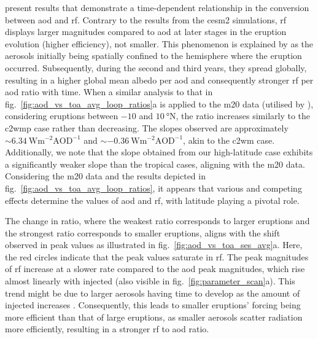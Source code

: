 \documentclass{ametsocV6.1}
\newcommand{\iso}[1][i]{{#1}njected \ce{SO2}}
\begin{document}
\citet[][their Fig.\ 1c,d]{marshall2020} present results that demonstrate a
time-dependent relationship in the conversion between \gls{aod} and \gls{rf}. Contrary
to the results from the \gls{cesm2} simulations, \gls{rf} displays larger magnitudes
compared to \gls{aod} at later stages in the eruption evolution (higher efficiency), not
smaller. This phenomenon is explained by \citet{marshall2020} as the aerosols initially
being spatially confined to the hemisphere where the eruption occurred. Subsequently,
during the second and third years, they spread globally, resulting in a higher global
mean albedo per \gls{aod} and consequently stronger \gls{rf} per \gls{aod} ratio with
time. When a similar analysis to that in fig.~\ref{fig:aod_vs_toa_avg_loop_ratios}a is
applied to the \gls{m20} data (utilised by \citet{marshall2020}), considering eruptions
between \(-10\) and \(\SI{10}{\degree\mathrm{N}}\), the ratio increases similarly to the
\gls{c2wmp} case rather than decreasing. The slopes observed are approximately
\(\sim\SI{6.34}{\watt\metre^{-2}\mathrm{AOD}^{-1}}\) and
\(\sim\SI{-0.36}{\watt\metre^{-2}\mathrm{AOD}^{-1}}\), akin to the \gls{c2wm} case.
Additionally, we note that the slope obtained from our high-latitude case exhibits a
significantly weaker slope than the tropical cases, aligning with the \gls{m20} data.
Considering the \gls{m20} data and the results depicted in
fig.~\ref{fig:aod_vs_toa_avg_loop_ratios}, it appears that various and competing effects
determine the values of \gls{aod} and \gls{rf}, with latitude playing a pivotal role.

The change in ratio, where the weakest ratio corresponds to larger eruptions and the
strongest ratio corresponds to smaller eruptions, aligns with the shift observed in peak
values as illustrated in fig.~\ref{fig:aod_vs_toa_ses_avg}a. Here, the red circles
indicate that the peak values saturate in \gls{rf}. The peak magnitudes of \gls{rf}
increase at a slower rate compared to the \gls{aod} peak magnitudes, which rise almost
linearly with \iso{} (also visible in fig.~\ref{fig:parameter_scan}a). This trend might
be due to larger aerosols having time to develop as the amount of \iso{} increases
\citep{niemeier2015,marshall2019}. Consequently, this leads to smaller eruptions'
forcing being more efficient than that of large eruptions, as smaller aerosols scatter
radiation more efficiently, resulting in a stronger \gls{rf} to \gls{aod} ratio.
\end{document}
